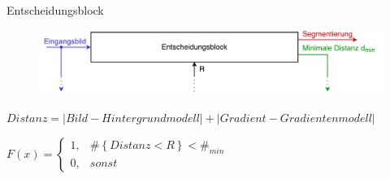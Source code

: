 \documentclass[hyperref={pdfpagelabels=false}]{beamer}
\begin{document}
\begin{frame}{Entscheidungsblock}
	\begin{figure}
		\centering
		\includegraphics[width=\linewidth]{./Bilder/PDF/decision_block.pdf}
	\end{figure}

	\begin{center}
		\small
		$ Distanz = | Bild - Hintergrundmodell | + | Gradient - Gradientenmodell | $
	\end{center}
	
	\vspace{2em}
	
	$ F(x) = \left\{\begin{array}{ll} 1, & \#\left\{ Distanz < R \right\} < \#_{min} \\
				0, & sonst\end{array}\right. $
\end{frame}

\begin{frame}[t]{}

\end{frame}

\begin{frame}

\end{frame}

\begin{frame}[t]{}

\end{frame}
\end{document}
